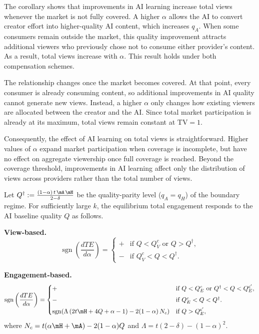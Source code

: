 The corollary shows that improvements in AI learning increase total views whenever the market is not fully covered. A higher $\alpha$ allows the AI to convert creator effort into higher-quality AI content, which increases $q_A$. When some consumers remain outside the market, this quality improvement attracts additional viewers who previously chose not to consume either provider's content. As a result, total views increase with $\alpha$. This result holds under both compensation schemes. 

The relationship changes once the market becomes covered. At that point, every consumer is already consuming content, so additional improvements in AI quality cannot generate new views. Instead, a higher $\alpha$ only changes how existing viewers are allocated between the creator and the AI. Since total market participation is already at its maximum, total views remain constant at $\mathrm{TV}=1$.

Consequently, the effect of AI learning on total views is straightforward. Higher values of $\alpha$ expand market participation when coverage is incomplete, but have no effect on aggregate viewership once full coverage is reached. Beyond the coverage threshold, improvements in AI learning affect only the distribution of views across providers rather than the total number of views.


\begin{corollary}\label{cor:alpha_te}
Let
$Q^{\dagger}:=\frac{(1-\alpha)\,t\,\mA\,\mH}{2-\delta}$ be the quality-parity level
($q_A=q_H$) of the boundary regime. For sufficiently large $k$, the equilibrium total engagement responds to the AI baseline quality $Q$ as follows.

\textbf{View-based.} 
    \[
    \operatorname{sgn}\left(\frac{dTE}{d\alpha}\right)=
    \begin{cases}
   + & \text{if } Q<Q^{c}_{V} \text{ or } Q> Q^\dagger,\\[4pt]
    - & \text{if }  Q^{c}_{V}<Q<Q^\dagger.
    \end{cases}
    \]

\textbf{Engagement-based.} 
    \[
    \operatorname{sgn}\left(\frac{dTE}{d\alpha}\right)=
    \begin{cases}
   + & \text{if } Q<Q^{c}_{E} \text{ or }  Q^\dagger<Q<Q_E^{\sf c'},\\[4pt]
    - & \text{if }  Q^{c}_{E}<Q<Q^\dagger.\\[4pt]
    \operatorname{sgn}(\Lambda\,(2t\mH + 4Q + \alpha - 1) - 2(1-\alpha)\,N_c) & \text{if } Q>Q_E^{\sf c'},
    \end{cases}
    \]
    where $N_c = t(\alpha\mH + \mA) - 2(1-\alpha)Q$ and
    $\Lambda = t(2-\delta) - (1-\alpha)^2$.
\end{corollary}

